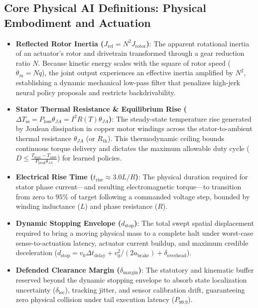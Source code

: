 \documentclass[
  letterpaper,
  DIV=11,
  numbers=noendperiod]{scrartcl}
\providecommand{\tightlist}{%
  \setlength{\itemsep}{0pt}\setlength{\parskip}{0pt}}
\begin{document}
\subsection{Core Physical AI Definitions: Physical Embodiment and
Actuation}\label{core-physical-ai-definitions-physical-embodiment-and-actuation}

\begin{itemize}
\tightlist
\item
  \textbf{Reflected Rotor Inertia
  (\(J_{\text{ref}} = N^2 J_{\text{rotor}}\))}: The apparent rotational
  inertia of an actuator's rotor and drivetrain transformed through a
  gear reduction ratio \(N\). Because kinetic energy scales with the
  square of rotor speed (\(\dot{\theta}_m = N \dot{q}\)), the joint
  output experiences an effective inertia amplified by \(N^2\),
  establishing a dynamic mechanical low-pass filter that penalizes
  high-jerk neural policy proposals and restricts backdrivability.
\item
  \textbf{Stator Thermal Resistance \& Equilibrium Rise
  (\(\Delta T_{\text{ss}} = P_{\text{loss}} \theta_{JA} = I^2 R(T) \theta_{JA}\))}:
  The steady-state temperature rise generated by Joulean dissipation in
  copper motor windings across the stator-to-ambient thermal resistance
  \(\theta_{JA}\) (or \(R_{\text{th}}\)). This thermodynamic ceiling
  bounds continuous torque delivery and dictates the maximum allowable
  duty cycle
  (\(D \le \frac{T_{\text{max}} - T_{\text{amb}}}{P_{\text{peak}} \theta_{JA}}\))
  for learned policies.
\item
  \textbf{Electrical Rise Time (\(t_{\text{rise}} \approx 3.0 L/R\))}:
  The physical duration required for stator phase current---and
  resulting electromagnetic torque---to transition from zero to \(95\%\)
  of target following a commanded voltage step, bounded by winding
  inductance (\(L\)) and phase resistance (\(R\)).
\item
  \textbf{Dynamic Stopping Envelope (\(d_{\text{stop}}\))}: The total
  swept spatial displacement required to bring a moving physical mass to
  a complete halt under worst-case sense-to-actuation latency, actuator
  current buildup, and maximum credible deceleration
  (\(d_{\text{stop}} = v_0 \Delta t_{\text{delay}} + v_0^2 / (2 a_{\text{brake}}) + \delta_{\text{overhead}}\)).
\item
  \textbf{Defended Clearance Margin (\(\delta_{\text{margin}}\))}: The
  statutory and kinematic buffer reserved beyond the dynamic stopping
  envelope to absorb state localization uncertainty
  (\(\delta_{\text{loc}}\)), tracking jitter, and sensor calibration
  drift, guaranteeing zero physical collision under tail execution
  latency (\(P_{99.9}\)).
\end{itemize}
\end{document}
